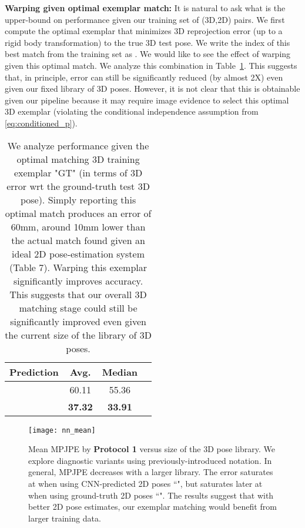 \documentclass[10pt,twocolumn,letterpaper]{article}
\begin{document}
{\bf Warping given optimal exemplar match:} It is natural to ask what is the upper-bound on performance given our training set of (3D,2D) pairs. We first compute the optimal exemplar that minimizes 3D reprojection error (up to a rigid body transformation) to the true 3D test pose. We write the index of this best match from the training set as . We would like to see the effect of warping given this optimal match. We analyze this combination in Table~\ref{table: gt3d_nn_comp}. This suggests that, in principle, error can still be significantly reduced (by almost 2X) even given our fixed library of 3D poses. However, it is not clear that this is obtainable given our pipeline because it may require image evidence to select this optimal 3D exemplar (violating the conditional independence assumption from \eqref{eq:conditioned_p}).


\begin{table}[t!]
\centering
\begin{tabular}{|l|c|c|c|}
\hline
Prediction & Avg. & Median \\
\hline
\hline
 & 60.11 & 55.36\\
 & \textbf{37.32} & \textbf{33.91}\\
\hline
\end{tabular}
\caption{We analyze performance given the optimal matching 3D training exemplar "GT" (in terms of 3D error wrt the ground-truth test 3D pose). Simply reporting this optimal match produces an error of 60mm, around 10mm lower than the actual match found given an ideal 2D pose-estimation system (Table 7). Warping this exemplar  significantly improves accuracy. This suggests that our overall 3D matching stage could still be significantly improved even given the current size of the library of 3D poses.} \label{table: gt3d_nn_comp}
\end{table}




\begin{figure}[t!]
\centering
\texttt{[image: nn\_mean]}
 \caption{Mean MPJPE by \textbf{Protocol 1} versus size of the 3D pose library. We explore diagnostic variants using previously-introduced notation.
   In general, MPJPE decreases with a larger library. The error saturates at   when using CNN-predicted 2D poses ``", but saturates later at  when using ground-truth 2D poses ``". The results suggest that with better 2D pose estimates, our exemplar matching would benefit from larger training data.}
 \label{fig:mean_nn}
\end{figure}
\end{document}

